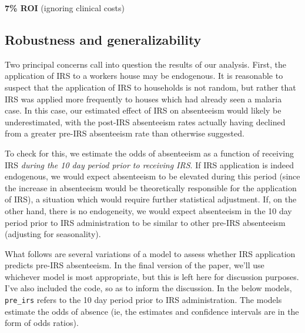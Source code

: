 \documentclass[]{article}
\begin{document}
\textbf{7\% ROI} (ignoring clinical costs)

\newpage

\subsection{Robustness and
generalizability}\label{robustness-and-generalizability}

Two principal concerns call into question the results of our analysis.
First, the application of IRS to a workers house may be
endogenous.
It is reasonable to suspect that the application of IRS to households is
not random, but rather that IRS was applied more frequently to houses
which had already seen a malaria case. In this case, our estimated
effect of IRS on absenteeism would likely be underestimated, with the
post-IRS absenteeism rates actually having declined from a greater
pre-IRS absenteeism rate than otherwise suggested.

To check for this, we estimate the odds of absenteeism as a function of
receiving IRS \emph{during the 10 day period prior to receiving IRS}. If
IRS application is indeed endogenous, we would expect absenteeism to be
elevated during this period (since the increase in absenteeism would be
theoretically responsible for the application of IRS), a situation which
would require further statistical adjustment. If, on the other hand,
there is no endogeneity, we would expect absenteeism in the 10 day
period prior to IRS administration to be similar to other pre-IRS
absenteeism (adjusting for seasonality).

What follows are several variations of a model to assess whether IRS
application predicts pre-IRS absenteeism. In the final version of the
paper, we'll use whichever model is most appropriate, but this is left
here for discussion purposes. I've also included the code, so as to
inform the discussion. In the below models, \texttt{pre\_irs} refers to
the 10 day period prior to IRS administration. The models estimate the
odds of absence (ie, the estimates and confidence intervals are in the
form of odds ratios).
\end{document}
